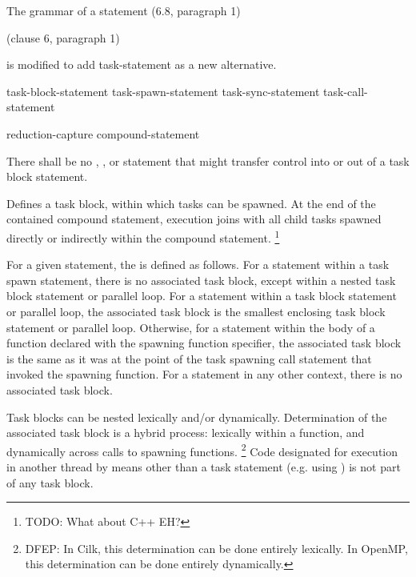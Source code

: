 
\pnum
The grammar of a statement (6.8, paragraph 1)
\begin{cpp}
(clause 6, paragraph 1)
\end{cpp}
is modified to add task-statement as a new alternative.


\begin{bnf}
\br
task-block-statement
\br
task-spawn-statement
\br
task-sync-statement
\br
task-call-statement
\end{bnf}


\begin{bnf}
\br
{}  reduction-capture\opt{} compound-statement
\end{bnf}


\pnum
There shall be no
,
,
or
statement that might transfer control into or out of
a task block statement.


\pnum
Defines a task block, within which tasks can be spawned.
At the end of the contained compound statement,
execution joins with
all child tasks spawned directly or indirectly
within the compound statement.
\footnote{TODO:
What about C++ EH?
}

\pnum
For a given statement, the
is defined as follows.
For a statement within a task spawn statement,
there is no associated task block,
except within a nested task block statement
or parallel loop.
For a statement within a task block statement
or parallel loop,
the associated task block is the smallest enclosing task block statement
or parallel loop.
Otherwise, for a statement within the body of a function
declared with the spawning function specifier,
the associated task block is the same as it was
at the point of the task spawning call statement
that invoked the spawning function.
For a statement in any other context,
there is no associated task block.

\begin{note}
Task blocks can be nested lexically and/or dynamically.
Determination of the associated task block is a hybrid process:
lexically within a function,
and dynamically across calls to spawning functions.%
\footnote{DFEP:
In Cilk, this determination can be done entirely lexically.
In OpenMP, this determination can be done entirely dynamically.
}
Code designated for execution in another thread
by means other than a task statement
(e.g. using
)
is not part of any task block.
\end{note}

